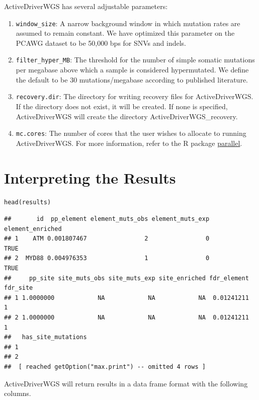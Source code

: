 \documentclass[]{article}
\begin{document}
ActiveDriverWGS has several adjustable parameters:

\begin{enumerate}
\def\labelenumi{\arabic{enumi})}
\item
  \texttt{window\_size}: A narrow background window in which mutation
  rates are assumed to remain constant. We have optimized this parameter
  on the PCAWG dataset to be 50,000 bps for SNVs and indels.
\item
  \texttt{filter\_hyper\_MB}: The threshold for the number of simple
  somatic mutations per megabase above which a sample is considered
  hypermutated. We define the default to be 30 mutations/megabase
  according to published literature.
\item
  \texttt{recovery.dir}: The directory for writing recovery files for
  ActiveDriverWGS. If the directory does not exist, it will be created.
  If none is specified, ActiveDriverWGS will create the directory
  ActiveDriverWGS\_recovery.
\item
  \texttt{mc.cores}: The number of cores that the user wishes to
  allocate to running ActiveDriverWGS. For more information, refer to
  the R package
  \href{https://stat.ethz.ch/R-manual/R-devel/library/parallel/doc/parallel.pdf}{parallel}.
\end{enumerate}

\section{Interpreting the Results}\label{interpreting-the-results}

\begin{verbatim}
head(results)
\end{verbatim}

\begin{verbatim}
##       id  pp_element element_muts_obs element_muts_exp element_enriched
## 1    ATM 0.001807467                2                0             TRUE
## 2  MYD88 0.004976353                1                0             TRUE
##     pp_site site_muts_obs site_muts_exp site_enriched fdr_element fdr_site
## 1 1.0000000            NA            NA            NA  0.01241211        1
## 2 1.0000000            NA            NA            NA  0.01241211        1
##   has_site_mutations
## 1                   
## 2                   
##  [ reached getOption("max.print") -- omitted 4 rows ]
\end{verbatim}

ActiveDriverWGS will return results in a data frame format with the
following columns.
\end{document}
